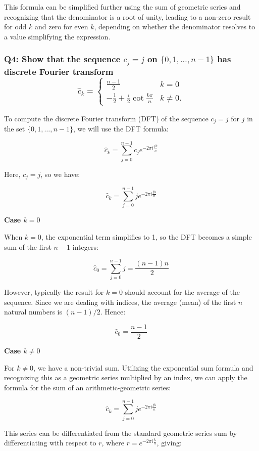 \documentclass[8pt]{article}
\begin{document}
This formula can be simplified further using the sum of geometric series and recognizing that the denominator is a root of unity, leading to a non-zero result for odd \( k \) and zero for even \( k \), depending on whether the denominator resolves to a value simplifying the expression.

\subsubsection*{Q4:
Show that the sequence \( c_j = j \) on \(\{0, 1, \ldots, n-1\}\) has discrete Fourier transform
\[
   \hat{c}_k = \begin{cases} 
   \frac{n-1}{2} & k = 0 \\
   -\frac{1}{2} + \frac{i}{2} \cot \frac{k\pi}{n} & k \neq 0.
   \end{cases}
\]}

To compute the discrete Fourier transform (DFT) of the sequence \(c_j = j\) for \(j\) in the set \(\{0, 1, \ldots, n-1\}\), we will use the DFT formula:

\[
\hat{c}_k = \sum_{j=0}^{n-1} c_j e^{-2\pi i \frac{jk}{n}}
\]

Here, \(c_j = j\), so we have:

\[
\hat{c}_k = \sum_{j=0}^{n-1} j e^{-2\pi i \frac{jk}{n}}
\]

\textbf{Case \(k = 0\)}

When \(k = 0\), the exponential term simplifies to 1, so the DFT becomes a simple sum of the first \(n-1\) integers:

\[
\hat{c}_0 = \sum_{j=0}^{n-1} j = \frac{(n-1) n}{2}
\]

However, typically the result for \(k = 0\) should account for the average of the sequence. Since we are dealing with indices, the average (mean) of the first \(n\) natural numbers is \((n-1)/2\). Hence:

\[
\hat{c}_0 = \frac{n-1}{2}
\]

\textbf{Case \(k \neq 0\)}

For \(k \neq 0\), we have a non-trivial sum. Utilizing the exponential sum formula and recognizing this as a geometric series multiplied by an index, we can apply the formula for the sum of an arithmetic-geometric series:

\[
\hat{c}_k = \sum_{j=0}^{n-1} j e^{-2\pi i \frac{jk}{n}}
\]

This series can be differentiated from the standard geometric series sum by differentiating with respect to \(r\), where \(r = e^{-2\pi i \frac{k}{n}}\), giving:
\end{document}
